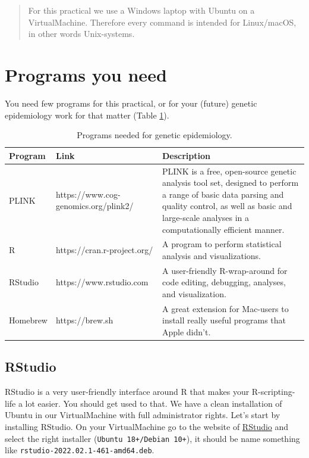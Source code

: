 \documentclass[
]{book}
\newcommand{\passthrough}[1]{#1}
\begin{document}
\begin{quote}
For this practical we use a Windows laptop with Ubuntu on a VirtualMachine. Therefore every command is intended for Linux/macOS, in other words Unix-systems.
\end{quote}

\hypertarget{programs-you-need}{%
\section{Programs you need}\label{programs-you-need}}

You need few programs for this practical, or for your (future) genetic epidemiology work for that matter (Table \ref{tab:programs}).

\begin{table}

\caption{\label{tab:programs}Programs needed for genetic epidemiology.}
\centering
\begin{tabular}[t]{l|l|l}
\hline
Program & Link & Description\\
\hline
PLINK & https://www.cog-genomics.org/plink2/ & PLINK is a free, open-source genetic analysis tool set, designed to perform a range of basic data parsing and quality control, as well as basic and large-scale analyses in a computationally efficient manner.\\
\hline
R & https://cran.r-project.org/ & A program to perform statistical analysis and visualizations.\\
\hline
RStudio & https://www.rstudio.com & A user-friendly R-wrap-around for code editing, debugging, analyses, and visualization.\\
\hline
Homebrew & https://brew.sh & A great extension for Mac-users to install really useful programs that Apple didn't.\\
\hline
\end{tabular}
\end{table}

\hypertarget{rstudio}{%
\subsection{RStudio}\label{rstudio}}

RStudio is a very user-friendly interface around R that makes your R-scripting-life a lot easier. You should get used to that.
We have a clean installation of Ubuntu in our VirtualMachine with full administrator rights. Let's start by installing RStudio. On your VirtualMachine go to the website of \href{https://www.rstudio.com/products/rstudio/download/\#download}{RStudio} and select the right installer (\passthrough{\lstinline!Ubuntu 18+/Debian 10+!}), it should be name something like \passthrough{\lstinline!rstudio-2022.02.1-461-amd64.deb!}.
\end{document}
